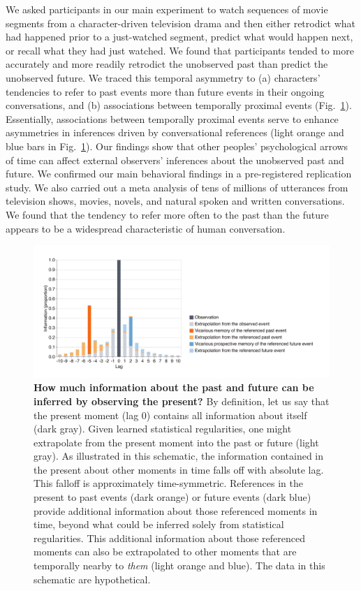 \documentclass[10pt]{article}
\begin{document}
We asked participants in our main experiment to watch sequences of movie segments from a character-driven television drama and then either retrodict what had happened prior to a just-watched segment, predict what would happen next, or recall what they had just watched. We found that participants tended to more accurately and more readily retrodict the unobserved past than predict the unobserved future. We traced this temporal asymmetry to (a) characters' tendencies to refer to past events more than future events in their ongoing conversations, and (b) associations between temporally proximal events (Fig.~\ref{fig:discussion}). Essentially, associations between temporally proximal events serve to enhance asymmetries in inferences driven by conversational references (light orange and blue bars in Fig.~\ref{fig:discussion}). Our findings show that other peoples' psychological arrows of time can affect external observers' inferences about the unobserved past and future. We confirmed our main behavioral findings in a pre-registered replication study. We also carried out a meta analysis of tens of millions of utterances from television shows, movies, novels, and natural spoken and written conversations. We found that the tendency to refer more often to the past than the future appears to be a widespread characteristic of human conversation.

\begin{figure}[tp]
  \centering
  \includegraphics[width=\textwidth]{discussion}

  \caption{\textbf{How much information about the past and future can be inferred by observing the present?} By definition, let us say that the present moment (lag 0) contains all information about itself (dark gray). Given learned statistical regularities, one might extrapolate from the present moment into the past or future (light gray). As illustrated in this schematic, the information contained in the present about other moments in time falls off with absolute lag. This falloff is approximately time-symmetric. References in the present to past events (dark orange) or future events (dark blue) provide additional information about those referenced moments in time, beyond what could be inferred solely from statistical regularities. This additional information about those referenced moments can also be extrapolated to other moments that are temporally nearby to \textit{them} (light orange and blue). The data in this schematic are hypothetical.}

  \label{fig:discussion}
\end{figure}
\end{document}
